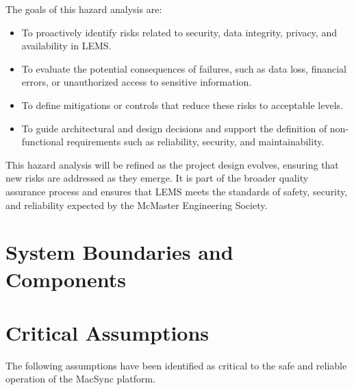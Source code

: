 \documentclass{article}
\begin{document}
\par
\vspace{1em}

The goals of this hazard analysis are:
\begin{itemize}
  \item To proactively identify risks related to security, data integrity, privacy, and availability in LEMS.
  \item To evaluate the potential consequences of failures, such as data loss, financial errors, or 
        unauthorized access to sensitive information.
  \item To define mitigations or controls that reduce these risks to acceptable levels.
  \item To guide architectural and design decisions and support the definition of non-functional 
        requirements such as reliability, security, and maintainability.
\end{itemize}

This hazard analysis will be refined as the project design evolves, ensuring that new risks are 
addressed as they emerge. It is part of the broader quality assurance process and ensures that LEMS 
meets the standards of safety, security, and reliability expected by the McMaster Engineering Society.

\section{System Boundaries and Components}


\section{Critical Assumptions}

The following assumptions have been identified as critical to the safe and reliable operation of the MacSync platform.
\end{document}
